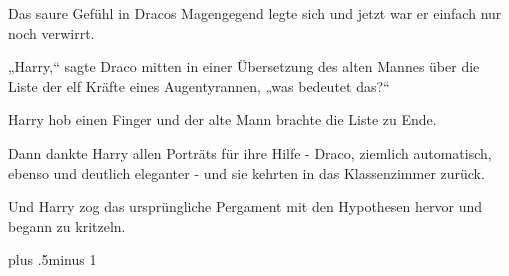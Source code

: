 Das saure Gefühl in Dracos Magengegend legte sich und jetzt war er einfach nur noch verwirrt.

„Harry,“ sagte Draco mitten in einer Übersetzung des alten Mannes über die Liste der elf Kräfte eines Augentyrannen, „was bedeutet das?“

Harry hob einen Finger und der alte Mann brachte die Liste zu Ende.

Dann dankte Harry allen Porträts für ihre Hilfe - Draco, ziemlich automatisch, ebenso und deutlich eleganter - und sie kehrten in das Klassenzimmer zurück.

Und Harry zog das ursprüngliche Pergament mit den Hypothesen hervor und begann zu kritzeln.

\baselineskip plus .5\textheight minus 1\baselineskip

\savetrivseps
\setlength{\topsep}{0pt}
\setlength{\partopsep}{0pt}

